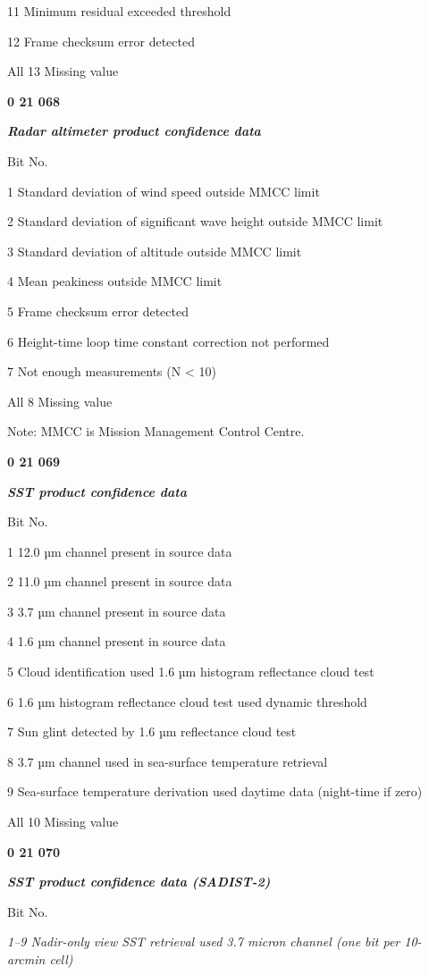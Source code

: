 11 Minimum residual exceeded threshold

12 Frame checksum error detected

All 13 Missing value

\textbf{0 21 068}

\emph{\textbf{Radar altimeter product confidence data}}

Bit No.

1 Standard deviation of wind speed outside MMCC limit

2 Standard deviation of significant wave height outside MMCC limit

3 Standard deviation of altitude outside MMCC limit

4 Mean peakiness outside MMCC limit

5 Frame checksum error detected

6 Height-time loop time constant correction not performed

7 Not enough measurements (N \textless{} 10)

All 8 Missing value

Note: MMCC is Mission Management Control Centre.

\textbf{0 21 069}

\emph{\textbf{SST product confidence data}}

Bit No.

1 12.0 µm channel present in source data

2 11.0 µm channel present in source data

3 3.7 µm channel present in source data

4 1.6 µm channel present in source data

5 Cloud identification used 1.6 µm histogram reflectance cloud test

6 1.6 µm histogram reflectance cloud test used dynamic threshold

7 Sun glint detected by 1.6 µm reflectance cloud test

8 3.7 µm channel used in sea-surface temperature retrieval

9 Sea-surface temperature derivation used daytime data (night-time if zero)

All 10 Missing value

\textbf{0 21 070}

\emph{\textbf{SST product confidence data (SADIST-2)}}

Bit No.

\emph{1--9 Nadir-only view SST retrieval used 3.7 micron channel (one bit per 10-arcmin cell)}

